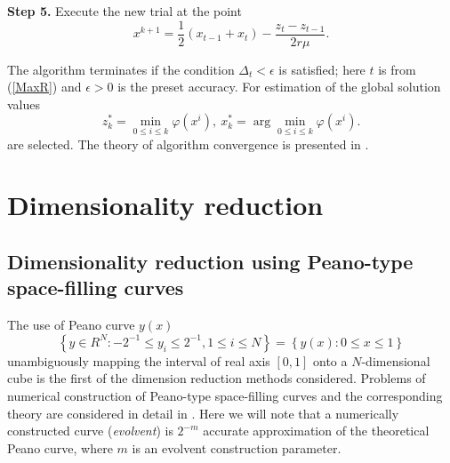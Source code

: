 \documentclass[runningheads]{llncs}
\begin{document}
\textbf{Step 5.} Execute the new trial at the point 
\begin{equation}\label{xk1}
x^{k+1}=\frac{1}{2}(x_{t-1}+x_t) - \frac{z_t-z_{t-1}}{2r\mu}.
\end{equation}

The algorithm terminates if the condition $\Delta_t<\epsilon$ is satisfied; 
here $t$ is from (\ref{MaxR}) and $\epsilon>0$ is the preset accuracy. For 
estimation of the global solution values
\[
z_k^\ast=\min_{0\leq i \leq k}\varphi(x^i), \ x_k^\ast=\arg \min_{0\leq i \leq
 k}\varphi(x^i).
\]
are selected. 
The theory of algorithm convergence is presented in \cite{Strongin2000}.

\section{Dimensionality reduction}
\subsection{Dimensionality reduction using Peano-type space-filling curves}
\label{SectionPeano}

The use of Peano curve $y(x)$ 
\begin{equation}
\left\{y\in R^N: -2^{-1}\leq y_i \leq 2^{-1}, 1 \leq i \leq N\right\}=\left\{
y(x):0\leq x \leq 1 \right\}
\end{equation}
unambiguously mapping the interval of real axis $[0,1]$ onto a 
$N$-dimensional cube is the first of the dimension reduction methods considered.
Problems of numerical construction of Peano-type space-filling curves and the 
corresponding theory are considered in detail in 
\cite{Sergeyev2013,Strongin2000}. Here we will note that a numerically 
constructed curve (\textit{evolvent}) is $2^{-m}$ accurate approximation of 
the theoretical Peano curve, where $m$ is an evolvent construction parameter.
\end{document}
